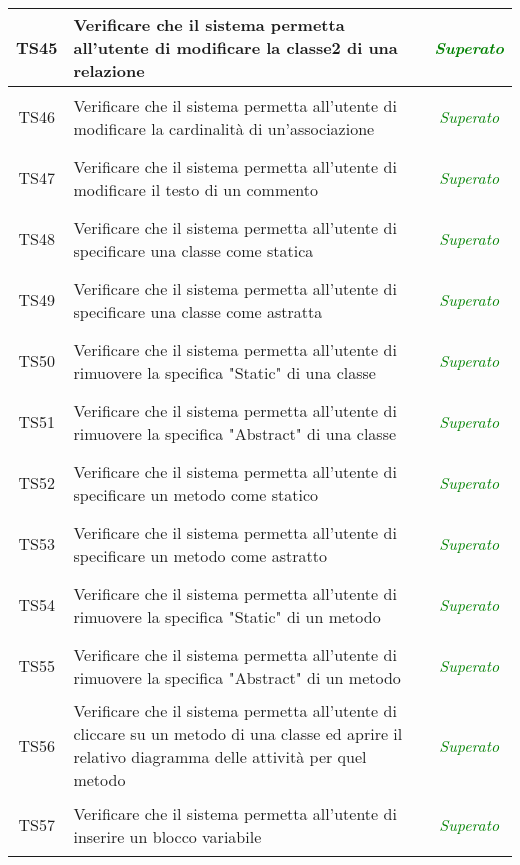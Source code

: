 \begin{longtable}{|c|>{}m{8cm}|c|}
\hypertarget{TS45}{TS45} & Verificare che il sistema permetta all'utente di modificare la classe2 di una relazione & \textcolor{Green}{\textit{Superato}}\\ \hline
\hypertarget{TS46}{TS46} & Verificare che il sistema permetta all'utente di modificare la cardinalità di un'associazione & \textcolor{Green}{\textit{Superato}}\\ \hline
\hypertarget{TS47}{TS47} & Verificare che il sistema permetta all'utente di modificare il testo di un commento & \textcolor{Green}{\textit{Superato}}\\ \hline
\hypertarget{TS48}{TS48} & Verificare che il sistema permetta all'utente di specificare una classe come statica & \textcolor{Green}{\textit{Superato}}\\ \hline
\hypertarget{TS49}{TS49} & Verificare che il sistema permetta all'utente di specificare una classe come astratta & \textcolor{Green}{\textit{Superato}}\\ \hline
\hypertarget{TS50}{TS50} & Verificare che il sistema permetta all'utente di rimuovere la specifica "Static" di una classe & \textcolor{Green}{\textit{Superato}}\\ \hline
\hypertarget{TS51}{TS51} & Verificare che il sistema permetta all'utente di rimuovere la specifica "Abstract" di una classe & \textcolor{Green}{\textit{Superato}}\\ \hline
\hypertarget{TS52}{TS52} & Verificare che il sistema permetta all'utente di specificare un metodo come statico & \textcolor{Green}{\textit{Superato}}\\ \hline
\hypertarget{TS53}{TS53} & Verificare che il sistema permetta all'utente di specificare un metodo come astratto & \textcolor{Green}{\textit{Superato}}\\ \hline
\hypertarget{TS54}{TS54} & Verificare che il sistema permetta all'utente di rimuovere la specifica "Static" di un metodo & \textcolor{Green}{\textit{Superato}}\\ \hline
\hypertarget{TS55}{TS55} & Verificare che il sistema permetta all'utente di rimuovere la specifica "Abstract" di un metodo & \textcolor{Green}{\textit{Superato}}\\ \hline
\hypertarget{TS56}{TS56} & Verificare che il sistema permetta all'utente di cliccare su un metodo di una classe ed aprire il relativo diagramma delle attività per quel metodo & \textcolor{Green}{\textit{Superato}}\\ \hline
\hypertarget{TS57}{TS57} & Verificare che il sistema permetta all'utente di inserire un blocco variabile & \textcolor{Green}{\textit{Superato}}\\ \hline

\end{longtable}

